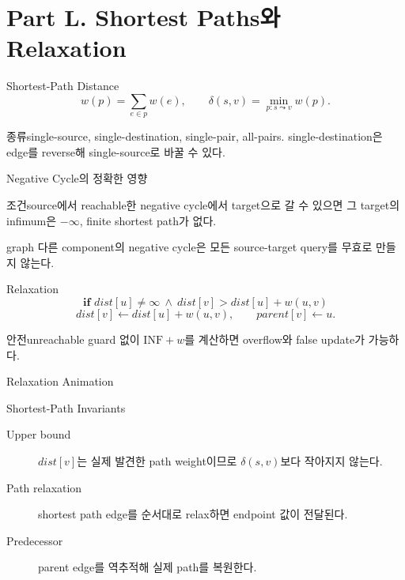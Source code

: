 \section{Part L. Shortest Paths와 Relaxation}
\begin{frame}{Shortest-Path Distance}
\[
w(p)=\sum_{e\in p}w(e),\qquad \delta(s,v)=\min_{p:s\leadsto v}w(p).
\]
\begin{block}{종류}single-source, single-destination, single-pair, all-pairs. single-destination은 edge를 reverse해 single-source로 바꿀 수 있다.\end{block}
\end{frame}
\begin{frame}{Negative Cycle의 정확한 영향}
\begin{alertblock}{조건}source에서 reachable한 negative cycle에서 target으로 갈 수 있으면 그 target의 infimum은 \(-\infty\), finite shortest path가 없다.\end{alertblock}
graph 다른 component의 negative cycle은 모든 source-target query를 무효로 만들지 않는다.
\end{frame}
\begin{frame}{Relaxation}
\[
\textbf{if }dist[u]\ne\infty\ \land\ dist[v]>dist[u]+w(u,v)
\]
\[
dist[v]\gets dist[u]+w(u,v),\qquad parent[v]\gets u.
\]
\begin{alertblock}{안전}unreachable guard 없이 \(\mathrm{INF}+w\)를 계산하면 overflow와 false update가 가능하다.\end{alertblock}
\end{frame}
\begin{frame}{Relaxation Animation}
\centering{}
\end{frame}
\begin{frame}{Shortest-Path Invariants}
\begin{description}\item[Upper bound]\(dist[v]\)는 실제 발견한 path weight이므로 \(\delta(s,v)\)보다 작아지지 않는다.\item[Path relaxation]shortest path edge를 순서대로 relax하면 endpoint 값이 전달된다.\item[Predecessor]parent edge를 역추적해 실제 path를 복원한다.\end{description}
\end{frame}

